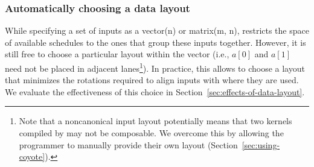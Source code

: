 \subsubsection*{Automatically choosing a data layout}
While specifying a set of inputs as a {\sf vector(n)} or {\sf matrix(m, n)}, \system restricts the space of available schedules to the ones that group these inputs together.
However, it is still free to choose a particular layout within the vector (i.e., $a[0]$ and $a[1]$ need not be placed in adjacent lanes\footnote{Note that a noncanonical input layout potentially means that two kernels compiled by \system may not be composable. We overcome this by allowing the programmer to manually provide their own layout (Section~\ref{sec:using-coyote}). }).
In practice, this allows \system to choose a layout that minimizes the rotations required to align inputs with where they are used.
We evaluate the effectiveness of this choice in Section~\ref{sec:effects-of-data-layout}.



